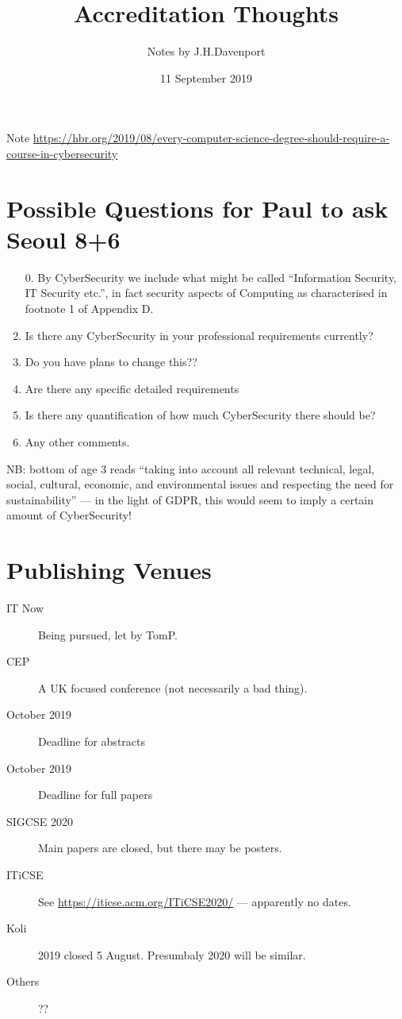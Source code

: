 \documentclass{article}
\begin{document}
\author{Notes by J.H.Davenport}
\title{Accreditation Thoughts}
\date{11 September 2019}
\maketitle
Note \url{https://hbr.org/2019/08/every-computer-science-degree-should-require-a-course-in-cybersecurity}
\section{Possible Questions for Paul to ask Seoul 8+6}
\begin{enumerate}
\item[0.]By CyberSecurity we include what might be called ``Information Security, IT Security etc.'', in fact security aspects of Computing as characterised in footnote 1 of Appendix D.
\item Is there any CyberSecurity in your professional requirements currently?
\item  Do you have plans to change this??
\item Are there any specific detailed requirements
\item Is there any quantification of how much CyberSecurity there should be?
\item Any other comments.
\end{enumerate}
NB: bottom of age 3 reads ``taking into account all relevant technical, legal, social, cultural, economic, and environmental issues and respecting the need for sustainability'' --- in the light of GDPR, this would seem to imply a certain amount of CyberSecurity!
\section{Publishing Venues}
\begin{description}
\item[IT Now]Being pursued, let by TomP.
\item[CEP]A UK focused conference (not necessarily a bad thing).
\item[ October 2019]Deadline for abstracts
\item[ October 2019]Deadline for full papers
\item[SIGCSE 2020]Main papers are closed, but there may be posters.
\item[ITiCSE]See \url{https://iticse.acm.org/ITiCSE2020/} --- apparently no dates.
\item[Koli]2019 closed 5 August. Presumbaly 2020 will be similar.
\item[Others]??
\end{description}
\end{document}
